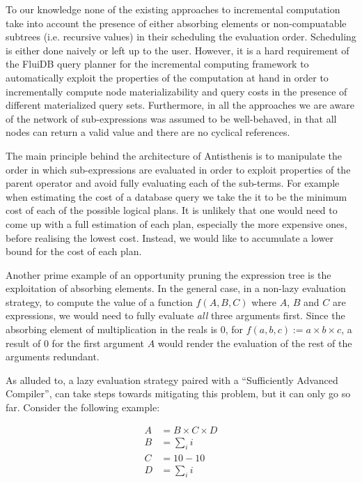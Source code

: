 To our knowledge none of the existing approaches to incremental
computation take into account the presence of either absorbing
elements or non-compuatable subtrees (i.e. recursive values) in their
scheduling the evaluation order. Scheduling is either done naively or
left up to the user. However, it is a hard requirement of the FluiDB
query planner for the incremental computing framework to automatically
exploit the properties of the computation at hand in order to
incrementally compute node materializability and query costs in the
presence of different materialized query sets. Furthermore, in all the
approaches we are aware of the network of sub-expressions was assumed
to be well-behaved, in that all nodes can return a valid value and
there are no cyclical references.

The main principle behind the architecture of Antisthenis is to
manipulate the order in which sub-expressions are evaluated in order
to exploit properties of the parent operator and avoid fully
evaluating each of the sub-terms. For example when estimating the cost
of a database query we take the it to be the minimum cost of each of
the possible logical plans. It is unlikely that one would need to come
up with a full estimation of each plan, especially the more expensive
ones, before realising the lowest cost. Instead, we would like to
accumulate a lower bound for the cost of each plan.

Another prime example of an opportunity pruning the expression tree is
the exploitation of absorbing elements. In the general case, in a
non-lazy evaluation strategy, to compute the value of a function
\(f(A,B,C)\) where \(A\), \(B\) and \(C\) are expressions, we would
need to fully evaluate \emph{all} three arguments first. Since the
absorbing element of multiplication in the reals is 0, for
\(f(a,b,c) := a \times b \times c\), a result of 0 for the first
argument \(A\) would render the evaluation of the rest of the
arguments redundant.

As alluded to, a lazy evaluation strategy paired with a ``Sufficiently
Advanced Compiler'', can take steps towards mitigating this problem,
but it can only go so far. Consider the following example:

\begin{align*}
A &= B \times C \times D \\
B &= \sum_i{i} \\
C &= 10 - 10 \\
D &= \sum_i{i}
\end{align*}

